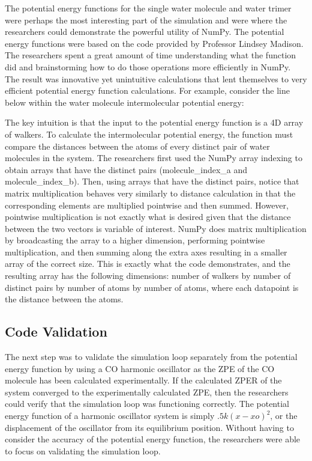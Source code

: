 \documentclass[journal=jacsat,manuscript=article]{achemso}
\begin{document}
The potential energy functions for the single water molecule and water trimer were perhaps the most interesting part of the simulation and were where the researchers could demonstrate the powerful utility of NumPy. The potential energy functions were based on the code provided by Professor Lindsey Madison. The researchers spent a great amount of time understanding what the function did and brainstorming how to do those operations more efficiently in NumPy. The result was innovative yet unintuitive calculations that lent themselves to very efficient potential energy function calculations. For example, consider the line below within the water molecule intermolecular potential energy:

The key intuition is that the input to the potential energy function is a 4D array of walkers. To calculate the intermolecular potential energy, the function must compare the distances between the atoms of every distinct pair of water molecules in the system. The researchers first used the NumPy array indexing to obtain arrays that have the distinct pairs (molecule\_index\_a and molecule\_index\_b). Then, using arrays that have the distinct pairs, notice that matrix multiplication behaves very similarly to distance calculation in that the corresponding elements are multiplied pointwise and then summed. However, pointwise multiplication is not exactly what is desired given that the distance between the two vectors is variable of interest. NumPy does matrix multiplication by broadcasting the array to a higher dimension, performing pointwise multiplication, and then summing along the extra axes resulting in a smaller array of the correct size. This is exactly what the code demonstrates, and the resulting array has the following dimensions: number of walkers by number of distinct pairs by number of atoms by number of atoms, where each datapoint is the distance between the atoms.

\subsection{Code Validation}

The next step was to validate the simulation loop separately from the potential energy function by using a CO harmonic oscillator as the ZPE of the CO molecule has been calculated experimentally. If the calculated ZPER of the system converged to the experimentally calculated ZPE, then the researchers could verify that the simulation loop was functioning correctly. The potential energy function of a harmonic oscillator system is simply $.5k(x-xo)^2$, or the displacement of the oscillator from its equilibrium position. Without having to consider the accuracy of the potential energy function, the researchers were able to focus on validating the simulation loop. 
	
\end{document}
